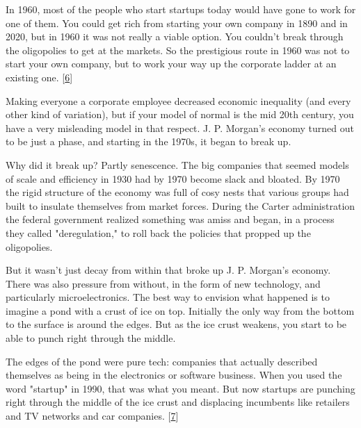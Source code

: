 In 1960, most of the people who start startups
                  today would have gone to work for one of them. You could get
                  rich from starting your own company in 1890 and in 2020, but
                  in 1960 it was not really a viable option. You couldn't break
                  through the oligopolies to get at the markets. So the
                  prestigious route in 1960 was not to start your own company,
                  but to work your way up the corporate ladder at an existing
                  one.
                  [\href{\#f6n}{6}]

Making everyone a corporate employee decreased
                  economic inequality (and every other kind of variation), but
                  if your model of normal is the mid 20th century, you have a
                  very misleading model in that respect. J. P. Morgan's economy
                  turned out to be just a phase, and starting in the 1970s, it
                  began to break up.

Why did it break up? Partly
                  senescence. The big companies that seemed models of scale and
                  efficiency in 1930 had by 1970 become slack and bloated. By
                  1970 the rigid structure of the economy was full of cosy nests
                  that various groups had built to insulate themselves from
                  market forces. During the Carter administration the federal
                  government realized something was amiss and began, in a
                  process they called "deregulation," to roll back the policies
                  that propped up the oligopolies.

But it wasn't just
                  decay from within that broke up J. P. Morgan's economy. There
                  was also pressure from without, in the form of new technology,
                  and particularly microelectronics. The best way to envision
                  what happened is to imagine a pond with a crust of ice on top.
                  Initially the only way from the bottom to the surface is
                  around the edges. But as the ice crust weakens, you start to
                  be able to punch right through the middle.

The
                  edges of the pond were pure tech: companies that actually
                  described themselves as being in the electronics or software
                  business. When you used the word "startup" in 1990, that was
                  what you meant. But now startups are punching right through
                  the middle of the ice crust and displacing incumbents like
                  retailers and TV networks and car companies.
                  [\href{\#f7n}{7}]

